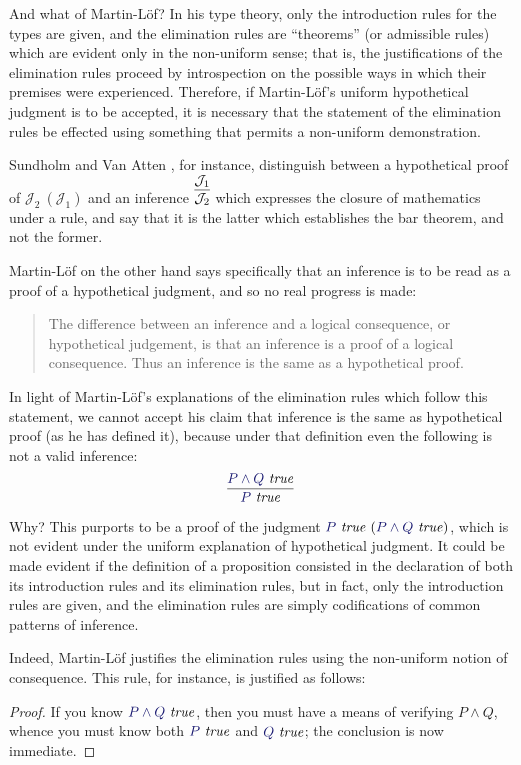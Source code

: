 \documentclass[11pt]{amsart}
\theoremstyle{definition}
\theoremstyle{remark}
\numberwithin{equation}{section}
\def\InputModeColorName{MidnightBlue}
\newcommand\InputMode[1]{{\color{\InputModeColorName}{#1}}}
\newcommand\HypJ[2]{#1\ (#2)}
\newcommand\JJ{\mathcal{J}}
\newcommand\IsTrue[1]{\InputMode{#1}\ \mathit{true}}
\begin{document}
And what of Martin-L\"of? In his type theory, only the introduction rules for
the types are given, and the elimination rules are ``theorems'' (or admissible
rules) which are evident only in the non-uniform sense; that is, the
justifications of the elimination rules proceed by introspection on the possible
ways in which their premises were experienced. Therefore, if Martin-L\"of's
uniform hypothetical judgment is to be accepted, it is necessary that the
statement of the elimination rules be effected using something that permits
a non-uniform demonstration.

Sundholm and Van Atten \cite{sundholm-mva}, for instance, distinguish between a
hypothetical proof of $\HypJ{\JJ_2}{\JJ_1}$ and an inference
$\infer{\JJ_2}{\JJ_1}$ which expresses the closure of mathematics under a rule,
and say that it is the latter which establishes the bar theorem, and not
the former.

Martin-L\"of on the other hand says specifically that an inference is to be read
as a proof of a hypothetical judgment, and so no real progress is made:
\begin{quote}
  The difference between an inference and a logical consequence, or hypothetical
  judgement, is that an inference is a proof of a logical consequence. Thus an
  inference is the same as a hypothetical proof. \cite{siena.lectures}
\end{quote}

In light of Martin-L\"of's explanations of the elimination rules which follow
this statement, we cannot accept his claim that inference is the same as
hypothetical proof (as he has defined it), because under that definition even
the following is not a valid inference:
\[
  \infer{
    \IsTrue{P}
  }{
    \IsTrue{P\land Q}
  }
\]

Why? This purports to be a proof of the judgment
$\HypJ{\IsTrue{P}}{\IsTrue{P\land Q}}$, which is not evident under the uniform
explanation of hypothetical judgment. It could be made evident if the definition
of a proposition consisted in the declaration of both its introduction rules and
its elimination rules, but in fact, only the introduction rules are given, and
the elimination rules are simply codifications of common patterns of inference.

Indeed, Martin-L\"of justifies the elimination rules using the non-uniform
notion of consequence. This rule, for instance, is justified as follows: 

\begin{proof}
If you know $\IsTrue{P\land Q}$, then you must have a means of verifying $P\land
Q$, whence you must know both $\IsTrue{P}$ and $\IsTrue{Q}$; the conclusion is
now immediate.
\end{proof}
\end{document}
